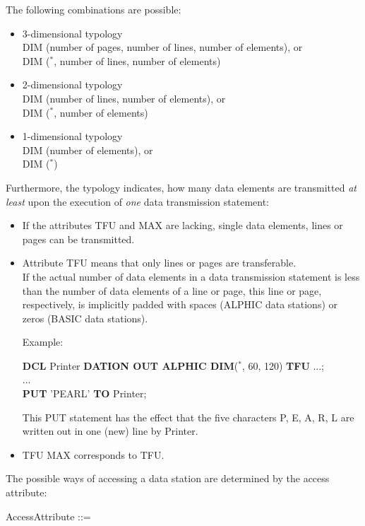 The following combinations are possible:
\begin{itemize}
\item 3-dimensional typology\\
DIM (number of pages, number of lines, number of elements), or\\
DIM ($^*$, number of lines, number of elements)
\item 2-dimensional typology\\
DIM (number of lines, number of elements), or\\
DIM ($^*$, number of elements)
\item 1-dimensional typology\\
DIM (number of elements), or\\
DIM ($^*$)
\end{itemize}

\begin{removed}
Furthermore, the typology indicates, how many data elements are
transmitted {\em at least} upon the execution of {\em one} data
transmission statement:
\begin{itemize}
\item If the attributes TFU and MAX are lacking, single data elements,
lines or pages can be transmitted.
\item Attribute TFU means that only lines or pages are transferable.\\
If the actual number of data elements in a data transmission statement
is less than the number of data elements of a line or page, this line or
page, respectively, is implicitly padded with spaces (ALPHIC data
stations) or zeros (BASIC data stations).

Example:

{\bf DCL} Printer {\bf DATION OUT ALPHIC DIM}($^*$, 60, 120) {\bf TFU} ...;\\
... \\
{\bf PUT} 'PEARL' {\bf TO} Printer;

This PUT statement has the effect that the five characters P, E, A, R,
L are written out in one (new) line by Printer.
\item TFU MAX corresponds to TFU.
\end{itemize}
\end{removed}

The possible ways of accessing a data station are determined by the
access attribute:

AccessAttribute ::= \\
\\

